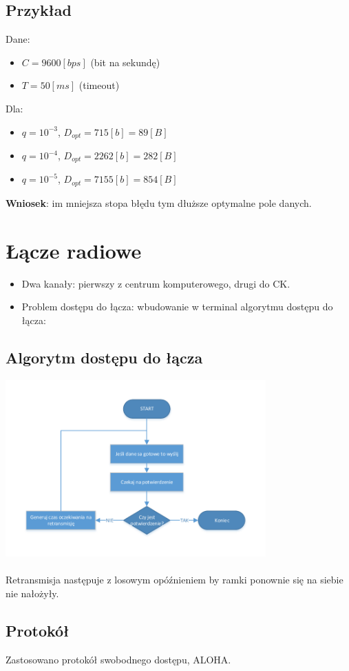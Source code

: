 \documentclass[a4paper,twoside]{article}
\begin{document}
\subsection{Przykład}
Dane:
\begin{itemize}
	\item $ C=9600[bps] $ (bit na sekundę)
	\item $ T=50[ms] $ (timeout)
\end{itemize}
Dla:
\begin{itemize}
	\item $ q=10^{-3} $, $ D_{opt}=715[b]=89[B] $
	\item $ q=10^{-4} $, $ D_{opt}=2262[b]=282[B] $
	\item $ q=10^{-5} $, $ D_{opt}=7155[b]=854[B] $
\end{itemize}
\textbf{Wniosek}: im mniejsza stopa błędu tym dłuższe optymalne pole danych.

\section{Łącze radiowe}
\begin{itemize}
	\item Dwa kanały: pierwszy z centrum komputerowego, drugi do CK.
	\item Problem dostępu do łącza: wbudowanie w terminal algorytmu dostępu do łącza:
\end{itemize}
\subsection{Algorytm dostępu do łącza}
\includegraphics[width=10cm]{./images/image19.pdf}\\\\
Retransmisja następuje z losowym opóźnieniem by ramki ponownie się na siebie nie nałożyły.\\
\subsection{Protokół}
Zastosowano protokół swobodnego dostępu, ALOHA.
\end{document}
